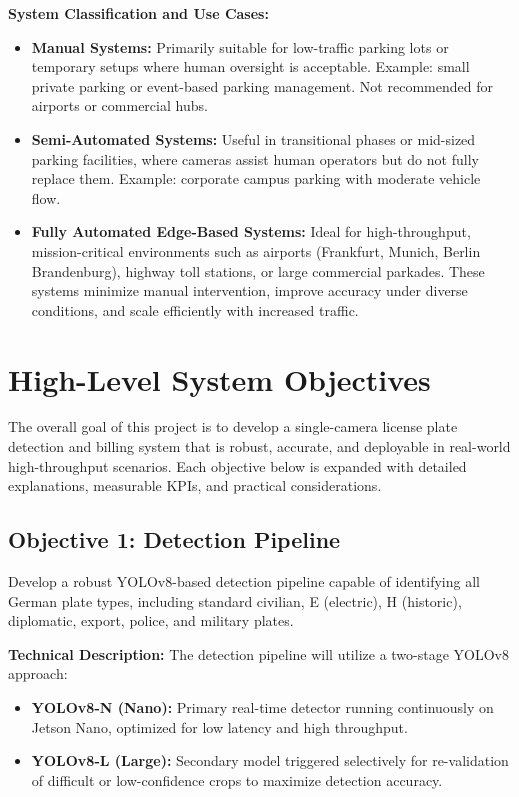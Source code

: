 	\bigskip
	
	\textbf{System Classification and Use Cases:}  
	
	\begin{itemize}
		 \item \textbf{Manual Systems:} Primarily suitable for low-traffic parking lots or temporary setups where human oversight is acceptable. Example: small private parking or event-based parking management. Not recommended for airports or commercial hubs.
		
		\item \textbf{Semi-Automated Systems:} Useful in transitional phases or mid-sized parking facilities, where cameras assist human operators but do not fully replace them. Example: corporate campus parking with moderate vehicle flow.
		
		\item \textbf{Fully Automated Edge-Based Systems:} Ideal for high-throughput, mission-critical environments such as airports (Frankfurt, Munich, Berlin Brandenburg), highway toll stations, or large commercial parkades. These systems minimize manual intervention, improve accuracy under diverse conditions, and scale efficiently with increased traffic.
		
	\end{itemize}
	
	\section{High-Level System Objectives}
	
	The overall goal of this project is to develop a single-camera license plate detection and billing system that is robust, accurate, and deployable in real-world high-throughput scenarios. Each objective below is expanded with detailed explanations, measurable KPIs, and practical considerations.
	
	\subsection{Objective 1: Detection Pipeline}
	Develop a robust YOLOv8-based detection pipeline capable of identifying all German plate types, including standard civilian, E (electric), H (historic), diplomatic, export, police, and military plates. 
	
	\textbf{Technical Description:}  
	The detection pipeline will utilize a two-stage YOLOv8 approach:
	\begin{itemize}
		\item \textbf{YOLOv8-N (Nano):} Primary real-time detector running continuously on Jetson Nano, optimized for low latency and high throughput.
		\item \textbf{YOLOv8-L (Large):} Secondary model triggered selectively for re-validation of difficult or low-confidence crops to maximize detection accuracy.
	\end{itemize}
	
